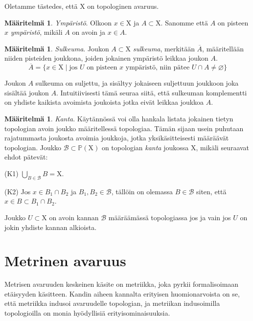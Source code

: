 \documentclass[12pt,a4paper,leqno]{report}
\newcommand{\X}{\mathrm{X}}
\newcommand{\Pow}{\mathbb{P}}
\newcommand{\B}{\mathcal{B}}
\theoremstyle{plain}
\theoremstyle{definition}
\newtheorem{maar}[equation]{Määritelmä}
\theoremstyle{remark}
\begin{document}
Oletamme tästedes, että $\X$ on topologinen avaruus.

\begin{maar}\label{ymp}
\emph{Ympäristö}. Olkoon $x \in \X$ ja $A \subset \X$. Sanomme että $A$ on pisteen $x$ \emph{ympäristö}, mikäli $A$ on avoin ja $x \in A$.
\end{maar}

\begin{maar}\label{sulk}
\emph{Sulkeuma}. Joukon $A \subset \X$ \emph{sulkeuma}, merkitään $\overline{A}$, määritellään niiden pisteiden joukkona, joiden jokainen ympäristö leikkaa joukon $A$.
\begin{equation}
\overline{A} = \{ x \in \X \mid \text{jos } U \text{ on pisteen } x \text{ ympäristö, niin pätee } U \cap A \not= \varnothing \}
\end{equation}
\end{maar}

Joukon $A$ sulkeuma on suljettu, ja sisältyy jokaiseen suljettuun joukkoon joka sisältää joukon $A$. Intuitiivisesti tämä seuraa siitä, että sulkeuman komplementti on yhdiste kaikista avoimista joukoista jotka eivät leikkaa joukkoa $A$.

\begin{maar}\label{kantamaar}
\emph{Kanta}. Käytännössä voi olla hankala listata jokainen tietyn topologian avoin joukko määritellessä topologiaa. Tämän sijaan usein puhutaan rajatummasta joukosta avoimia joukkoja, jotka yksikäsitteisesti määräävät topologian. Joukko $\B \subset \Pow(\X)$ on topologian \emph{kanta} joukossa $\X$, mikäli seuraavat ehdot pätevät:

(K1) $\bigcup_{B \in \B} B = \X$.

(K2) Jos $x \in B_1 \cap B_2$ ja $B_1,B_2\in \B$, tällöin on olemassa $B \in \B$ siten, että $x \in B \subset B_1 \cap B_2$.
\end{maar}

Joukko $U \subset \X$ on avoin kannan $\B$ määräämässä topologiassa jos ja vain jos $U$ on jokin yhdiste kannan alkioista.

\chapter{Metrinen avaruus}\label{MET}

Metrisen avaruuden keskeinen käsite on metriikka, joka pyrkii formalisoimaan etäisyyden käsitteen. Kandin aiheen kannalta erityisen huomionarvoista on se, että metriikka indusoi avaruudelle topologian, ja metriikan indusoimilla topologioilla on monia hyödyllisiä erityisominaisuuksia.
\end{document}
